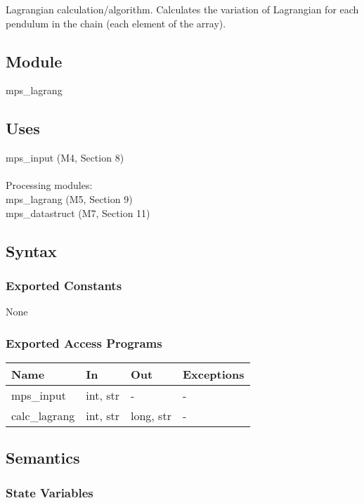 \documentclass[12pt, titlepage]{article}
\begin{document}
Lagrangian calculation/algorithm. Calculates the variation of Lagrangian for 
each pendulum in the chain (each element of the array).

\subsection{Module}

mps\_lagrang

\subsection{Uses}

mps\_input (M4, Section 8)\\\\
Processing modules:\\
mps\_lagrang (M5, Section 9)\\
mps\_datastruct (M7, Section 11)\\

\subsection{Syntax}

\subsubsection{Exported Constants}

None

\subsubsection{Exported Access Programs}

\begin{center}
\begin{tabular}{p{2cm} p{4cm} p{4cm} p{2cm}}
\hline
\textbf{Name} & \textbf{In} & \textbf{Out} & \textbf{Exceptions} \\
\hline
mps\_input  & int, str & - & - \\
calc\_lagrang & int, str & long, str & - \\
\hline
\end{tabular}
\end{center}

\subsection{Semantics}

\subsubsection{State Variables}
\end{document}
